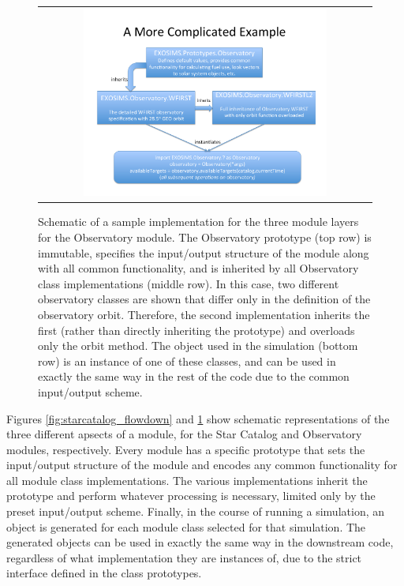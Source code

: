 \documentclass[cleanfoot]{asme2ej}
\begin{document}
\begin{figure}[ht]
    \begin{center}
        \begin{tabular}{c}
             \includegraphics[width=0.75\textwidth]{observatory_flowdown}
        \end{tabular}
    \end{center}
    \caption{Schematic of a sample implementation for the three module layers for the Observatory module. The Observatory prototype (top row) is immutable, specifies the input/output structure of the module along with all common functionality, and is inherited by all Observatory class implementations (middle row).  In this case, two different observatory classes are shown that differ only in the definition of the observatory orbit.  Therefore, the second implementation inherits the first (rather than directly inheriting the prototype) and overloads only the orbit method. The object used in the simulation (bottom row) is an instance of one of these classes, and can be used in exactly the same way in the rest of the code due to the common input/output scheme.}
    \label{fig:observatory_flowdown}
\end{figure}

Figures \ref{fig:starcatalog_flowdown} and \ref{fig:observatory_flowdown} show schematic representations of the three different apsects of a module, for the Star Catalog and Observatory modules, respectively.  Every module has a specific prototype that sets the input/output structure of the module and encodes any common functionality for all module class implementations.  The various implementations inherit the prototype and perform whatever processing is necessary, limited only by the preset input/output scheme.  Finally, in the course of running a simulation, an object is generated for each module class selected for that simulation.  The generated objects can be used in exactly the same way in the downstream code, regardless of what implementation they are instances of, due to the strict interface defined in the class prototypes.
\end{document}

